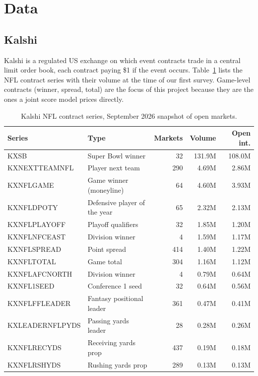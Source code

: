\section{Data}\label{sec:data}

\subsection{Kalshi}

Kalshi is a regulated US exchange on which event contracts trade in a central limit order book, each contract paying \$1 if the event occurs. Table~\ref{tab:kalshi_series} lists the NFL contract series with their volume at the time of our first survey. Game-level contracts (winner, spread, total) are the focus of this project because they are the ones a joint score model prices directly.

\begin{table}[H]
\centering
\footnotesize
\begin{tabular}{llrrr}
\toprule
\textbf{Series} & \textbf{Type} & \textbf{Markets} & \textbf{Volume} & \textbf{Open int.} \\
\midrule
KXSB & Super Bowl winner & 32 & 131.9M & 108.0M \\
KXNEXTTEAMNFL & Player next team & 290 & 4.69M & 2.86M \\
KXNFLGAME & Game winner (moneyline) & 64 & 4.60M & 3.93M \\
KXNFLDPOTY & Defensive player of the year & 65 & 2.32M & 2.13M \\
KXNFLPLAYOFF & Playoff qualifiers & 32 & 1.85M & 1.20M \\
KXNFLNFCEAST & Division winner & 4 & 1.59M & 1.17M \\
KXNFLSPREAD & Point spread & 414 & 1.40M & 1.22M \\
KXNFLTOTAL & Game total & 304 & 1.16M & 1.12M \\
KXNFLAFCNORTH & Division winner & 4 & 0.79M & 0.64M \\
KXNFL1SEED & Conference 1 seed & 32 & 0.64M & 0.56M \\
KXNFLFFLEADER & Fantasy positional leader & 361 & 0.47M & 0.41M \\
KXLEADERNFLPYDS & Passing yards leader & 28 & 0.28M & 0.26M \\
KXNFLRECYDS & Receiving yards prop & 437 & 0.19M & 0.18M \\
KXNFLRSHYDS & Rushing yards prop & 289 & 0.13M & 0.13M \\
\bottomrule
\end{tabular}
\caption{Kalshi NFL contract series, September 2026 snapshot of open markets.}
\label{tab:kalshi_series}
\end{table}

